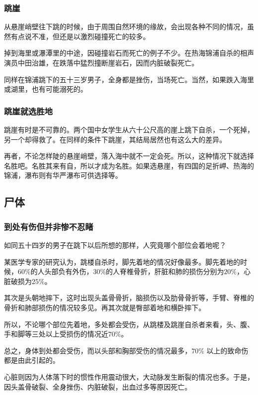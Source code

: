 \documentclass[UTF8]{ctexart}
\begin{document}
\subsubsection*{跳崖}

从悬崖峭壁往下跳的时候，由于周围自然环境的缘故，会出现各种不同的情况，虽然有点说不准，但还是以激烈碰撞死亡的较多。

掉到海里或瀑潭里的中途，因碰撞岩石而死亡的例子不少。在热海锦浦自杀的相声演员中田治雄，在跌落中猛烈撞断崖岩石，因而内脏破裂死亡。

同样在锦浦跳下的五十三岁男子，全身都是挫伤，当场死亡。当然，如果跌入海里或湖里，也有可能溺死的。

\subsubsection*{跳崖就选胜地}

跳崖有时是不可靠的。两个国中女学生从六十公尺高的崖上跳下自杀，一个死掉，另一个却得救了。在同样的条件下跳崖，其结局居然也有这么大的差异。

再者，不论怎样陡的悬崖峭壁，落入海中就不一定会死。所以，这种情况下就选择名胜吧。名胜其来有自，所以才成为名胜。如果选悬崖，有四国的足折岬、热海的锦浦，瀑布则有华严瀑布可供选择等。

\subsection{尸体}

\subsubsection*{到处有伤但并非惨不忍睹}

如同五十四岁的男子在跳下以后所想的那样，人究竟哪个部位会着地呢？

某医学专家的研究认为，跳楼自杀时，脚先着地的情况好像最多。脚先着地的时候，$60\%$的人头部负有外伤，$30\%$的人脊椎骨折，肝脏和肺的损伤分别为$20\%$，心脏破损为$25\%$。

其次是头朝地摔下，这时出现头盖骨骨折，脑损伤以及肋骨骨折等，手臂、脊椎的骨折和肺部损伤的情况较多见。再其次就是臀部着地和横卧摔下。

所以，不论哪个部位先着地，多处都会受伤，从跳楼及跳崖自杀者来看，头、腹、手和脚等三处以上受损伤的情况近$70\%$。

总之，身体到处都会受伤，而以头部和胸部受伤的情况最多，$70\%$ 以上的致命伤都是由此引起的。

心脏则因为人体落下时的惯性作用震动很大，大动脉发生断裂的情况也多。于是，因头盖骨破裂、全身挫伤、内脏破裂，出血过多等原因死亡。
\end{document}
